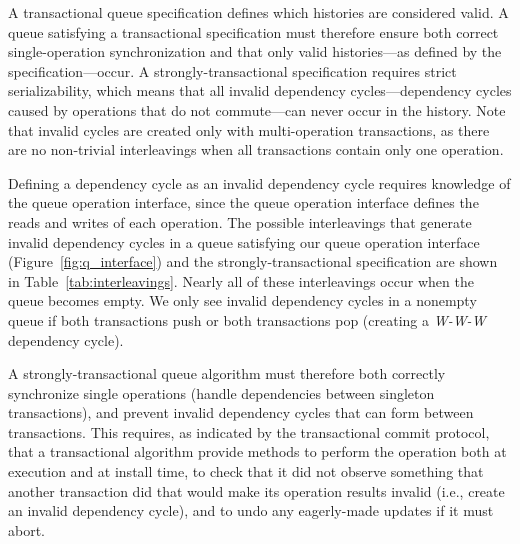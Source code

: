 A transactional queue specification defines which histories are considered valid. A queue satisfying a transactional specification must therefore ensure both correct single-operation synchronization and that only valid histories---as defined by the specification---occur.
A strongly-transactional specification requires strict serializability, which means that all invalid dependency cycles---dependency cycles caused by operations that do not commute---can never occur in the history. Note that invalid cycles are created only with multi-operation transactions, as there are no non-trivial interleavings when all transactions contain only one operation.

Defining a dependency cycle as an invalid dependency cycle requires knowledge of the queue operation interface, since the queue operation interface defines the reads and writes of each operation. The possible interleavings that generate invalid dependency cycles in a queue satisfying our queue operation interface (Figure~\ref{fig:q_interface}) and the strongly-transactional specification are shown in Table~\ref{tab:interleavings}. Nearly all of these interleavings occur when the queue becomes empty. We only see invalid dependency cycles in a nonempty queue if both transactions push or both transactions pop (creating a \emph{W-W-W} dependency cycle). 

A strongly-transactional queue algorithm must therefore both correctly synchronize single operations (handle dependencies between singleton transactions), and prevent invalid dependency cycles that can form between transactions. This requires, as indicated by the transactional commit protocol, that a transactional algorithm provide methods to perform the operation both at execution and at install time, to check that it did not observe something that another transaction did that would make its operation results invalid (i.e., create an invalid dependency cycle), and to undo any eagerly-made updates if it must abort. 

